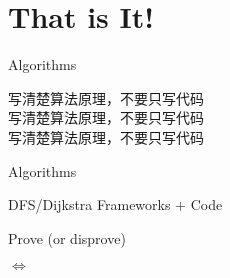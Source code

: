 \section{That is It!}

\begin{frame}{Algorithms}
  \begin{center}
  {\Large 写清楚算法原理，不要只写代码} \\[15pt]
  {\Large 写清楚算法原理，不要只写代码} \\[15pt]
  {\Large 写清楚算法原理，不要只写代码}
  \end{center}
\end{frame}
\begin{frame}{Algorithms}
  \centerline{\Large DFS/Dijkstra Frameworks + Code}
\end{frame}
\begin{frame}{Prove (or disprove)}
  \centerline{\huge $\iff$}
\end{frame}
